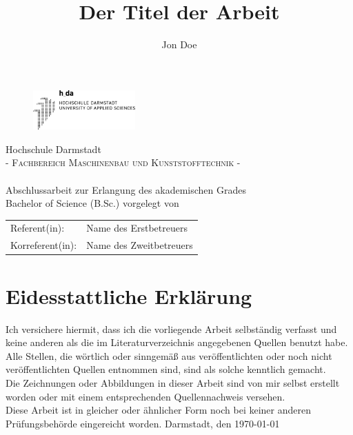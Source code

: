 \documentclass[a4paper,12pt]{article}
\title{Der Titel der Arbeit}
\author{Jon Doe}
\begin{document}
\newpage\null\thispagestyle{empty}\newpage
\newpage
\pagestyle{empty}
\begin{figure}[t]
	\centering
	\includegraphics[width=0.35\textwidth]{fig/Logo/logo-h-da.eps}
\end{figure}
\vfill
\begin{center}
\Large Hochschule Darmstadt \\
\normalsize \textsc{- Fachbereich Maschinenbau und Kunststofftechnik -} \\
\vfill
\makeatletter
\Huge \@title \\
\normalsize
\vspace{12pt}
Abschlussarbeit zur Erlangung des akademischen Grades \\
Bachelor of Science (B.Sc.)
\vfill
vorgelegt von \\
\@author
\makeatother
\vfill
\begin{tabular}[h]{p{4cm}l}
	Referent(in): & Name des Erstbetreuers\\
	Korreferent(in):  & Name des Zweitbetreuers \\
\end{tabular}
\end{center}
\newpage
\pagestyle{plain}
\section*{Eidesstattliche Erklärung}
Ich versichere hiermit, dass ich die vorliegende Arbeit selbständig verfasst und keine
anderen als die im Literaturverzeichnis angegebenen Quellen benutzt habe. \\
\noindent Alle Stellen, die wörtlich oder sinngemäß aus veröffentlichten oder noch nicht veröffentlichten Quellen entnommen sind, sind als solche kenntlich gemacht. \\
\noindent Die Zeichnungen oder Abbildungen in dieser Arbeit sind von mir selbst erstellt worden oder mit einem entsprechenden Quellennachweis versehen. \\
\noindent Diese Arbeit ist in gleicher oder ähnlicher Form noch bei keiner anderen Prüfungsbehörde eingereicht worden.
\newline\newline
Darmstadt, den \today
\newpage
{}
{}
\let\oldabstractname\abstractname
\renewcommand{\abstractname}{Abstract}
\begin{abstract}
\blindtext \blindtext
\end{abstract}
\newpage
{}
{}
\let\abstractname\oldabstractname
\begin{abstract}
\blindtext \blindtext
\end{abstract}
\newpage
\end{document}
